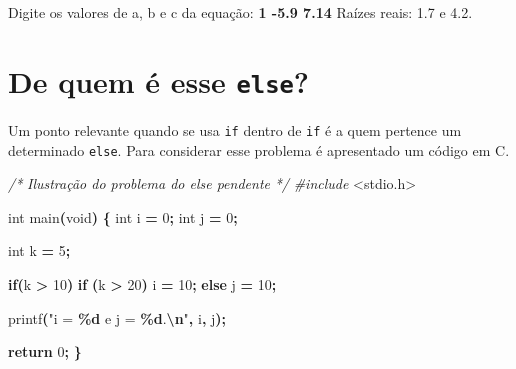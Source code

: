 \documentclass[
  11pt,
  a4paper,
]{scrbook}
\newenvironment{Shaded}{\begin{snugshade}}{\end{snugshade}}
\newcommand{\CommentTok}[1]{\textcolor[rgb]{0.56,0.35,0.01}{\textit{#1}}}
\newcommand{\ControlFlowTok}[1]{\textcolor[rgb]{0.13,0.29,0.53}{\textbf{#1}}}
\newcommand{\DataTypeTok}[1]{\textcolor[rgb]{0.13,0.29,0.53}{#1}}
\newcommand{\DecValTok}[1]{\textcolor[rgb]{0.00,0.00,0.81}{#1}}
\newcommand{\ImportTok}[1]{#1}
\newcommand{\KeywordTok}[1]{\textcolor[rgb]{0.13,0.29,0.53}{\textbf{#1}}}
\newcommand{\NormalTok}[1]{#1}
\newcommand{\OperatorTok}[1]{\textcolor[rgb]{0.81,0.36,0.00}{\textbf{#1}}}
\newcommand{\PreprocessorTok}[1]{\textcolor[rgb]{0.56,0.35,0.01}{\textit{#1}}}
\newcommand{\SpecialCharTok}[1]{\textcolor[rgb]{0.81,0.36,0.00}{\textbf{#1}}}
\newcommand{\StringTok}[1]{\textcolor[rgb]{0.31,0.60,0.02}{#1}}
\begin{document}
\begin{Shaded}
\begin{Highlighting}[]
\NormalTok{Digite os valores de a, b e c da equação: }\KeywordTok{ 1 {-}5.9 7.14 }
\NormalTok{Raízes reais: 1.7 e 4.2.}
\end{Highlighting}
\end{Shaded}

\section{\texorpdfstring{De quem é esse
\texttt{else}?}{De quem é esse else?}}\label{de-quem-uxe9-esse-else}

Um ponto relevante quando se usa \texttt{if} dentro de \texttt{if} é a
quem pertence um determinado \texttt{else}. Para considerar esse
problema é apresentado um código em C.

\begin{Shaded}
\begin{Highlighting}[]
\CommentTok{/*}
\CommentTok{Ilustração do problema do else pendente}
\CommentTok{*/}
\PreprocessorTok{\#include }\ImportTok{\textless{}stdio.h\textgreater{}}

\DataTypeTok{int}\NormalTok{ main}\OperatorTok{(}\DataTypeTok{void}\OperatorTok{)} \OperatorTok{\{}
    \DataTypeTok{int}\NormalTok{ i }\OperatorTok{=} \DecValTok{0}\OperatorTok{;}
    \DataTypeTok{int}\NormalTok{ j }\OperatorTok{=} \DecValTok{0}\OperatorTok{;}

    \DataTypeTok{int}\NormalTok{ k }\OperatorTok{=} \DecValTok{5}\OperatorTok{;}

    \ControlFlowTok{if}\OperatorTok{(}\NormalTok{k }\OperatorTok{\textgreater{}} \DecValTok{10}\OperatorTok{)}
        \ControlFlowTok{if} \OperatorTok{(}\NormalTok{k }\OperatorTok{\textgreater{}} \DecValTok{20}\OperatorTok{)}
\NormalTok{            i }\OperatorTok{=} \DecValTok{10}\OperatorTok{;}
    \ControlFlowTok{else} 
\NormalTok{        j }\OperatorTok{=} \DecValTok{10}\OperatorTok{;}

\NormalTok{    printf}\OperatorTok{(}\StringTok{"i = }\SpecialCharTok{\%d}\StringTok{ e j = }\SpecialCharTok{\%d}\StringTok{.}\SpecialCharTok{\textbackslash{}n}\StringTok{"}\OperatorTok{,}\NormalTok{ i}\OperatorTok{,}\NormalTok{ j}\OperatorTok{);}
    
    \ControlFlowTok{return} \DecValTok{0}\OperatorTok{;}
\OperatorTok{\}}
\end{Highlighting}
\end{Shaded}
\end{document}
